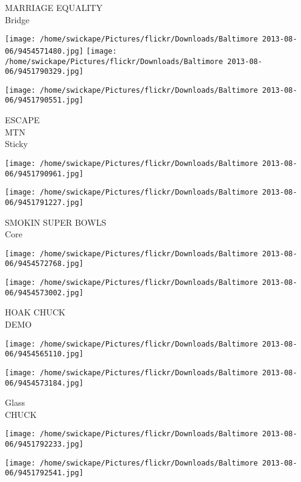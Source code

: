 \documentclass[10pt,letterpaper]{article}
\begin{document}
MARRIAGE EQUALITY\\
Bridge\\
\pagebreak

\texttt{[image: /home/swickape/Pictures/flickr/Downloads/Baltimore 2013-08-06/9454571480.jpg]}
\texttt{[image: /home/swickape/Pictures/flickr/Downloads/Baltimore 2013-08-06/9451790329.jpg]}

\vspace{0.25in}
\texttt{[image: /home/swickape/Pictures/flickr/Downloads/Baltimore 2013-08-06/9451790551.jpg]}

ESCAPE\\
MTN\\
Sticky\\
\pagebreak

\texttt{[image: /home/swickape/Pictures/flickr/Downloads/Baltimore 2013-08-06/9451790961.jpg]}

\vspace{0.25in}
\texttt{[image: /home/swickape/Pictures/flickr/Downloads/Baltimore 2013-08-06/9451791227.jpg]}

SMOKIN SUPER BOWLS\\
Core\\
\pagebreak

\texttt{[image: /home/swickape/Pictures/flickr/Downloads/Baltimore 2013-08-06/9454572768.jpg]}

\vspace{0.25in}
\texttt{[image: /home/swickape/Pictures/flickr/Downloads/Baltimore 2013-08-06/9454573002.jpg]}

HOAK CHUCK\\
DEMO\\
\pagebreak

\texttt{[image: /home/swickape/Pictures/flickr/Downloads/Baltimore 2013-08-06/9454565110.jpg]}

\vspace{0.25in}
\texttt{[image: /home/swickape/Pictures/flickr/Downloads/Baltimore 2013-08-06/9454573184.jpg]}

Glass\\
CHUCK\\
\pagebreak

\texttt{[image: /home/swickape/Pictures/flickr/Downloads/Baltimore 2013-08-06/9451792233.jpg]}

\vspace{0.25in}
\texttt{[image: /home/swickape/Pictures/flickr/Downloads/Baltimore 2013-08-06/9451792541.jpg]}
\end{document}
